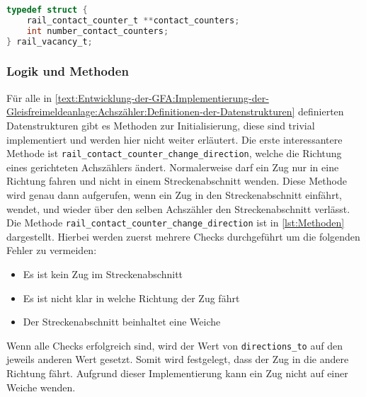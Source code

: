 \begin{margin}
    \begin{lstlisting}[caption={Definition der Datenstruktur rail\_vacancy\_t},label={lst:Structs3},language=C]
typedef struct {
    rail_contact_counter_t **contact_counters;
    int number_contact_counters;
} rail_vacancy_t;
    \end{lstlisting}
\end{margin}

\subsubsection{Logik und Methoden}\label{text:Entwicklung-der-GFA:Implementierung-der-Gleisfreimeldeanlage:Achszähler:Logik-und-Methoden-der-Achszähler}

Für alle in \autoref{text:Entwicklung-der-GFA:Implementierung-der-Gleisfreimeldeanlage:Achszähler:Definitionen-der-Datenstrukturen}  definierten Datenstrukturen gibt es Methoden zur Initialisierung, diese sind trivial implementiert und werden hier nicht weiter erläutert. Die erste interessantere Methode ist \texttt{rail\_contact\_counter\_change\_direction}, welche die Richtung eines gerichteten Achszählers ändert. Normalerweise darf ein Zug nur in eine Richtung fahren und nicht in einem Streckenabschnitt wenden. Diese Methode wird genau dann aufgerufen, wenn ein Zug in den Streckenabschnitt einfährt, wendet, und wieder über den selben Achszähler den Streckenabschnitt verlässt. Die Methode \texttt{rail\_contact\_counter\_change\_direction} ist in \autoref{lst:Methoden} dargestellt. Hierbei werden zuerst mehrere Checks durchgeführt um die folgenden Fehler zu vermeiden:
\begin{itemize}
    \item Es ist kein Zug im Streckenabschnitt
    \item Es ist nicht klar in welche Richtung der Zug fährt
    \item Der Streckenabschnitt beinhaltet eine Weiche
\end{itemize}
Wenn alle Checks erfolgreich sind, wird der Wert von \texttt{directions\_to} auf den jeweils anderen Wert gesetzt. Somit wird festgelegt, dass der Zug in die andere Richtung fährt. Aufgrund dieser Implementierung kann ein Zug nicht auf einer Weiche wenden.

